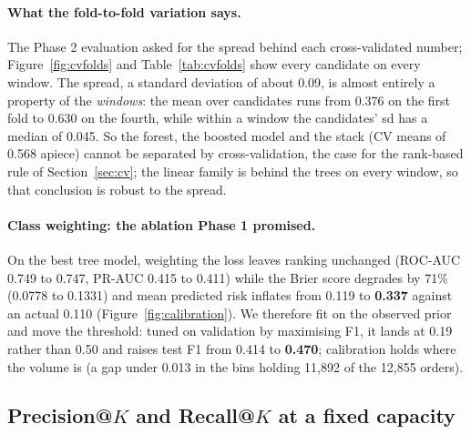 \paragraph{What the fold-to-fold variation says.}
The Phase 2 evaluation asked for the spread behind each cross-validated number;
Figure~\ref{fig:cvfolds} and Table~\ref{tab:cvfolds} show every candidate on
every window. The spread, a standard deviation of about 0.09, is almost entirely
a property of the \emph{windows}: the mean over candidates runs from 0.376 on
the first fold to 0.630 on the fourth, while within a window the candidates' sd has
a median of 0.045. So the forest, the boosted model and the stack (CV means of
0.568 apiece) cannot be separated by cross-validation, the case for the
rank-based rule of Section~\ref{sec:cv}; the linear family is behind the trees on
every window, so that conclusion is robust to the spread.

\paragraph{Class weighting: the ablation Phase 1 promised.} On the best tree
model, weighting the loss leaves ranking unchanged (ROC-AUC 0.749 to 0.747,
PR-AUC 0.415 to 0.411) while the Brier score degrades by 71\% (0.0778 to
0.1331) and mean predicted risk inflates from 0.119 to \textbf{0.337} against an
actual 0.110 (Figure~\ref{fig:calibration}). We therefore fit on the observed
prior and move the threshold: tuned on validation by maximising F1, it lands at
0.19 rather than 0.50 and raises test F1 from 0.414 to \textbf{0.470};
calibration holds where the volume is (a gap under 0.013 in the bins holding
11{,}892 of the 12{,}855 orders).

\subsection{Precision@$K$ and Recall@$K$ at a fixed capacity}
\label{sec:results-capacity}

